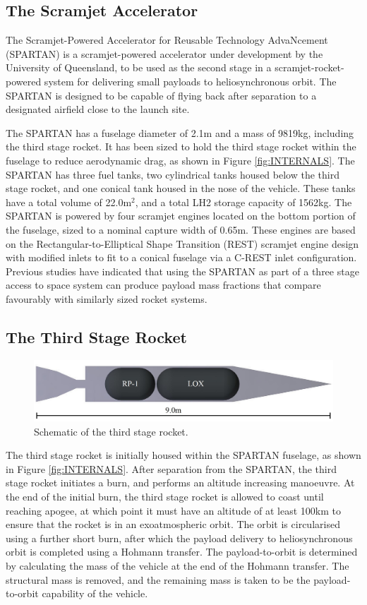 \documentclass[journal]{new-aiaa}
\begin{document}
\subsection{The Scramjet Accelerator}
The Scramjet-Powered Accelerator for Reusable Technology AdvaNcement (SPARTAN) is a scramjet-powered accelerator under development by the University of Queensland, to be used as the second stage in a scramjet-rocket-powered system for delivering small payloads to heliosynchronous orbit\cite{Preller2017b}. The SPARTAN is designed to be capable of flying back after separation to a designated airfield close to the launch site.  

The SPARTAN has a fuselage diameter of 2.1m and a mass of 9819kg, including the third stage rocket. It has been sized to hold the third stage rocket within the fuselage to reduce aerodynamic drag, as shown in Figure \ref{fig:INTERNALS}. The SPARTAN has three fuel tanks, two cylindrical tanks housed below the third stage rocket, and one conical tank housed in the nose of the vehicle. These tanks have a total volume of 22.0m$^2$, and a total LH2 storage capacity of 1562kg. 
The SPARTAN is powered by four scramjet engines located on the bottom portion of the fuselage, sized to a nominal capture width of 0.65m. These engines are based on the Rectangular-to-Elliptical Shape Transition (REST) scramjet engine design\cite{Suraweera2009} with modified inlets to fit to a conical fuselage via a C-REST inlet configuration\cite{Gollan2010}. Previous studies have indicated that using the SPARTAN as part of a three stage access to space system can produce payload mass fractions that compare favourably with similarly sized rocket systems\cite{Preller2015a,Preller2017b}. 


\subsection{The Third Stage Rocket}\label{section:rocket}
\begin{figure}[ht]
	\centering
	\includegraphics[width=0.6\linewidth]{3rdStage}
	\caption{Schematic of the third stage rocket.}
	\label{fig:ThirdStage}
\end{figure}

The third stage rocket is initially housed within the SPARTAN fuselage, as shown in Figure \ref{fig:INTERNALS}. After separation from the SPARTAN, the third stage rocket initiates a burn, and performs an altitude increasing manoeuvre. 
At the end of the initial burn, the third stage rocket is allowed to coast until reaching apogee, at which point it must have an altitude of at least 100km to ensure that the rocket is in an exoatmospheric orbit. The orbit is circularised using a further short burn, after which the payload delivery to heliosynchronous orbit is completed using a Hohmann transfer. The payload-to-orbit is determined by calculating the mass of the vehicle at the end of the Hohmann transfer. The structural mass is removed, and the remaining mass is taken to be the payload-to-orbit capability of the vehicle. 
\end{document}

